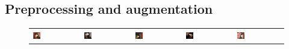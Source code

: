 \subsection{Preprocessing and augmentation}
\label{sec:pipeline:training:augment}
\begin{figure}[htb]
    \begin{tabularx}{\textwidth}{XXXXX}
        \includegraphics[width=0.170\textwidth]{figures/aug/parts_example} &
        \includegraphics[width=0.170\textwidth]{figures/aug/parts_example_2} &
        \includegraphics[width=0.170\textwidth]{figures/aug/parts_example_18} &
        \includegraphics[width=0.170\textwidth]{figures/aug/parts_example_19} &
        \includegraphics[width=0.170\textwidth]{figures/aug/parts_example_5} \\


\end{tabularx}
\end{figure}
